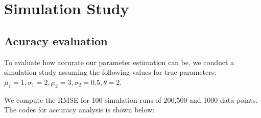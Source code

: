 \documentclass[11pt,]{article}
\begin{document}
\hypertarget{simulation-study}{%
\section{Simulation Study}\label{simulation-study}}

\hypertarget{acuracy-evaluation}{%
\subsection{Acuracy evaluation}\label{acuracy-evaluation}}

To evaluate how accurate our parameter estimation can be, we conduct a
simulation study assuming the following values for true parameters:
\(\mu_1=1,\sigma_1=2,\mu_2=3,\sigma_2=0.5,\theta=2\).

We compute the RMSE for 100 simulation runs of 200,500 and 1000 data
points. The codes for accuracy analysis is shown below:
\end{document}
